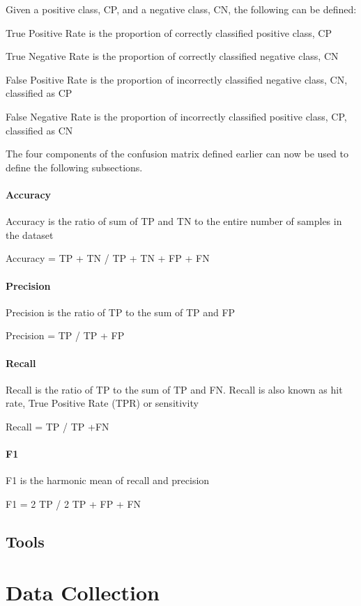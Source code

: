 \documentclass[a4paper,12pt,twoside]{report}
\begin{document}
Given a positive class, CP, and a negative class, CN, the following can be defined:

True Positive Rate is the proportion of correctly classified positive class, CP

True Negative Rate is the proportion of correctly classified negative class, CN

False Positive Rate is the proportion of incorrectly classified negative class, CN, classified as CP

False Negative Rate is the proportion of incorrectly classified positive class, CP, classified as CN

The four components of the confusion matrix defined earlier can now be used to define the following subsections.

\subsubsection{Accuracy} 
Accuracy is the ratio of sum of TP and TN to the entire number of samples in the dataset

Accuracy = TP + TN / TP + TN + FP + FN

\subsubsection{Precision} 
Precision is the ratio of TP to the sum of TP and FP

Precision = TP / TP + FP

\subsubsection{Recall} 
Recall is the ratio of TP to the sum of TP and FN. Recall is also known as hit rate, True Positive Rate (TPR) or sensitivity

Recall = TP / TP +FN

\subsubsection{F1} 
F1 is the harmonic mean of recall and precision

F1 = 2 TP / 2 TP + FP + FN

\section{Tools}


\chapter{Data Collection}
\end{document}

